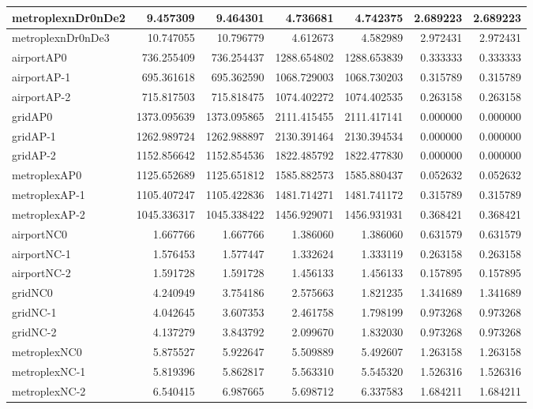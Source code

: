 \begin{longtable}{|l|r|r|r|r|r|r|}
metroplexnDr0nDe2 & 9.457309 & 9.464301 & 4.736681 & 4.742375 & 2.689223 & 2.689223 \\ \hline
metroplexnDr0nDe3 & 10.747055 & 10.796779 & 4.612673 & 4.582989 & 2.972431 & 2.972431 \\ \hline
airportAP0 & 736.255409 & 736.254437 & 1288.654802 & 1288.653839 & 0.333333 & 0.333333 \\ \hline
airportAP-1 & 695.361618 & 695.362590 & 1068.729003 & 1068.730203 & 0.315789 & 0.315789 \\ \hline
airportAP-2 & 715.817503 & 715.818475 & 1074.402272 & 1074.402535 & 0.263158 & 0.263158 \\ \hline
gridAP0 & 1373.095639 & 1373.095865 & 2111.415455 & 2111.417141 & 0.000000 & 0.000000 \\ \hline
gridAP-1 & 1262.989724 & 1262.988897 & 2130.391464 & 2130.394534 & 0.000000 & 0.000000 \\ \hline
gridAP-2 & 1152.856642 & 1152.854536 & 1822.485792 & 1822.477830 & 0.000000 & 0.000000 \\ \hline
metroplexAP0 & 1125.652689 & 1125.651812 & 1585.882573 & 1585.880437 & 0.052632 & 0.052632 \\ \hline
metroplexAP-1 & 1105.407247 & 1105.422836 & 1481.714271 & 1481.741172 & 0.315789 & 0.315789 \\ \hline
metroplexAP-2 & 1045.336317 & 1045.338422 & 1456.929071 & 1456.931931 & 0.368421 & 0.368421 \\ \hline
airportNC0 & 1.667766 & 1.667766 & 1.386060 & 1.386060 & 0.631579 & 0.631579 \\ \hline
airportNC-1 & 1.576453 & 1.577447 & 1.332624 & 1.333119 & 0.263158 & 0.263158 \\ \hline
airportNC-2 & 1.591728 & 1.591728 & 1.456133 & 1.456133 & 0.157895 & 0.157895 \\ \hline
gridNC0 & 4.240949 & 3.754186 & 2.575663 & 1.821235 & 1.341689 & 1.341689 \\ \hline
gridNC-1 & 4.042645 & 3.607353 & 2.461758 & 1.798199 & 0.973268 & 0.973268 \\ \hline
gridNC-2 & 4.137279 & 3.843792 & 2.099670 & 1.832030 & 0.973268 & 0.973268 \\ \hline
metroplexNC0 & 5.875527 & 5.922647 & 5.509889 & 5.492607 & 1.263158 & 1.263158 \\ \hline
metroplexNC-1 & 5.819396 & 5.862817 & 5.563310 & 5.545320 & 1.526316 & 1.526316 \\ \hline
metroplexNC-2 & 6.540415 & 6.987665 & 5.698712 & 6.337583 & 1.684211 & 1.684211 \\ \hline
\end{longtable}

